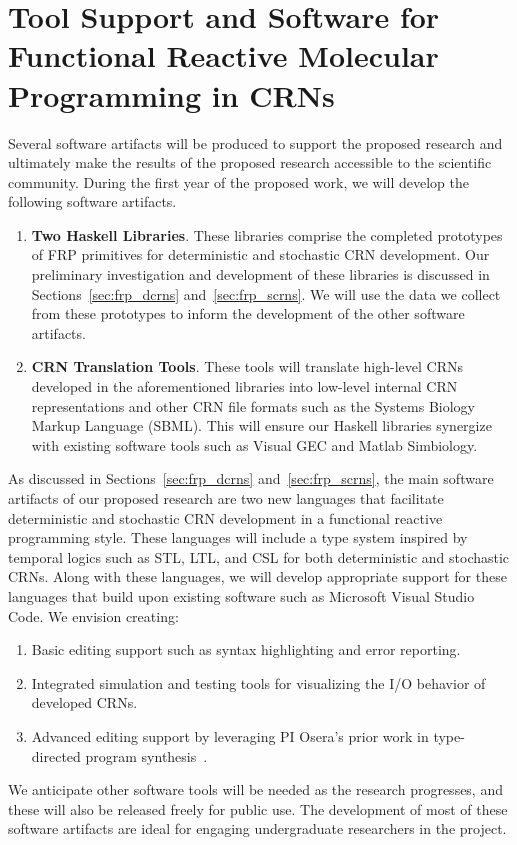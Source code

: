 
\section{Tool Support and Software for Functional Reactive Molecular Programming in CRNs}
\label{sec:software_support}

Several software artifacts will be produced to support the proposed research and ultimately make the results of the proposed research accessible to the scientific community.
During the first year of the proposed work, we will develop the following software artifacts.
\begin{enumerate}[nosep]
	\item \textbf{Two Haskell Libraries}.
    These libraries comprise the completed prototypes of FRP primitives for deterministic and stochastic CRN development.
	Our preliminary investigation and development of these libraries is discussed in Sections~\ref{sec:frp_dcrns} and~\ref{sec:frp_scrns}.
	We will use the data we collect from these prototypes to inform the development of the other software artifacts.
	
	\item \textbf{CRN Translation Tools}.
    These tools will translate high-level CRNs developed in the aforementioned libraries into low-level internal CRN representations and other CRN file formats such as the Systems Biology Markup Language (SBML).
	This will ensure our Haskell libraries synergize with existing software tools such as Visual GEC and Matlab Simbiology.
\end{enumerate}

As discussed in Sections~\ref{sec:frp_dcrns} and~\ref{sec:frp_scrns}, the main software artifacts of our proposed research are two new languages that facilitate deterministic and stochastic CRN development in a functional reactive programming style.
These languages will include a type system inspired by temporal logics such as STL, LTL, and CSL for both deterministic and stochastic CRNs.
Along with these languages, we will develop appropriate support for these languages that build upon existing software such as Microsoft Visual Studio Code.
We envision creating:
\begin{enumerate}[nosep]
	\item Basic editing support such as syntax highlighting and error reporting.
	\item Integrated simulation and testing tools for visualizing the I/O behavior of developed CRNs.
  \item Advanced editing support by leveraging PI Osera's prior work in type-directed program synthesis~\cite{osera:thesis:2015, osera:pldi:2015, frankle:popl:2015, osera:tyde:2019}.
\end{enumerate}

We anticipate other software tools will be needed as the research progresses, and these will also be released freely for public use.
The development of most of these software artifacts are ideal for engaging undergraduate researchers in the project.
